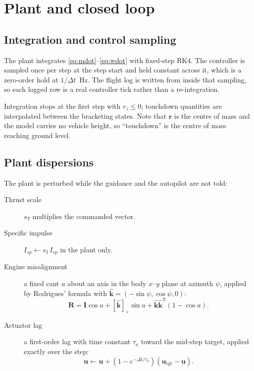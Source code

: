 \documentclass[11pt,a4paper]{article}
\newcommand{\vect}[1]{\mathbf{#1}}
\begin{document}
\section{Plant and closed loop}
\label{sec:closedloop}

\subsection{Integration and control sampling}

The plant integrates \eqref{eq:mdot}--\eqref{eq:wdot} with fixed-step RK4. The
controller is sampled once per step at the step start and held constant across
it, which is a zero-order hold at $1/\Delta t$~Hz. The flight log is written from
inside that sampling, so each logged row is a real controller tick rather than a
re-integration.

Integration stops at the first step with $r_z\le0$; touchdown quantities are
interpolated between the bracketing states. Note that $\vect{r}$ is the centre of
mass and the model carries no vehicle height, so ``touchdown'' is the centre of
mass reaching ground level.

\subsection{Plant dispersions}

The plant is perturbed while the guidance and the autopilot are not told:

\begin{description}
\item[Thrust scale] $s_T$ multiplies the commanded vector.
\item[Specific impulse] $I_{sp}\leftarrow s_{I}\,I_{sp}$ in the plant only.
\item[Engine misalignment] a fixed cant $a$ about an axis in the body $x$--$y$
  plane at azimuth $\psi$, applied by Rodrigues' formula with
  $\hat{\vect{k}}=(-\sin\psi,\cos\psi,0)$:
  \begin{equation}
  \vect{R} = \vect{I}\cos a + [\hat{\vect{k}}]_\times \sin a
           + \hat{\vect{k}}\hat{\vect{k}}^{\mathsf{T}}(1-\cos a).
  \end{equation}
\item[Actuator lag] a first-order lag with time constant $\tau_a$ toward the
  mid-step target, applied exactly over the step:
  \begin{equation}
  \vect{u} \leftarrow \vect{u} + \left(1-e^{-\Delta t/\tau_a}\right)
    \left(\vect{u}_{\mathrm{tgt}}-\vect{u}\right).
  \end{equation}
\end{description}
\end{document}
